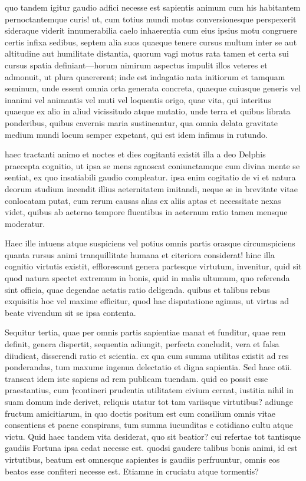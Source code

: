  quo tandem igitur gaudio adfici necesse est sapientis animum cum his habitantem pernoctantemque curis! ut, cum totius mundi motus conversionesque perspexerit sideraque viderit innumerabilia caelo inhaerentia cum eius ipsius motu congruere certis infixa sedibus, septem alia suos quaeque tenere cursus multum inter se aut altitudine aut humilitate distantia, quorum vagi motus rata tamen et certa sui cursus spatia definiant—horum nimirum aspectus impulit illos veteres et admonuit, ut plura quaererent; inde est indagatio nata initiorum et tamquam seminum, unde essent omnia orta generata concreta, quaeque cuiusque generis vel inanimi vel animantis vel muti vel loquentis origo, quae vita, qui interitus quaeque ex alio in aliud vicissitudo atque mutatio, unde terra et quibus librata ponderibus, quibus cavernis maria sustineantur, qua omnia delata gravitate medium mundi locum semper expetant, qui est idem infimus in rutundo.

 haec tractanti animo et noctes et dies cogitanti existit illa a deo Delphis praecepta cognitio, ut ipsa se mens agnoscat coniunctamque cum divina mente se sentiat, ex quo insatiabili gaudio compleatur. ipsa enim cogitatio de vi et natura deorum studium incendit illius aeternitatem imitandi, neque se in brevitate vitae conlocatam putat, cum rerum causas alias ex aliis aptas et necessitate nexas videt, quibus ab aeterno tempore fluentibus in aeternum ratio tamen mensque moderatur.

 Haec ille intuens atque suspiciens vel potius omnis partis orasque circumspiciens quanta rursus animi tranquillitate humana et citeriora considerat! hinc illa cognitio virtutis existit, efflorescunt genera partesque virtutum, invenitur, quid sit quod natura spectet extremum in bonis, quid in malis ultumum, quo referenda sint officia, quae degendae aetatis ratio deligenda. quibus et talibus rebus exquisitis hoc vel maxime efficitur, quod hac disputatione agimus, ut virtus ad beate vivendum sit se ipsa contenta.

 Sequitur tertia, quae per omnis partis sapientiae manat et funditur, quae rem definit, genera dispertit, sequentia adiungit, perfecta concludit, vera et falsa diiudicat, disserendi ratio et scientia. ex qua cum summa utilitas existit ad res ponderandas, tum maxume ingenua delectatio et digna sapientia. Sed haec otii. transeat idem iste sapiens ad rem publicam tuendam. quid eo possit esse praestantius, cum †contineri prudentia utilitatem civium cernat, iustitia nihil in suam domum inde derivet, reliquis utatur tot tam variisque virtutibus? adiunge fructum amicitiarum, in quo doctis positum est cum consilium omnis vitae consentiens et paene conspirans, tum summa iucunditas e cotidiano cultu atque victu. Quid haec tandem vita desiderat, quo sit beatior? cui refertae tot tantisque gaudiis Fortuna ipsa cedat necesse est. quodsi gaudere talibus bonis animi, id est virtutibus, beatum est omnesque sapientes is gaudiis perfruuntur, omnis eos beatos esse confiteri necesse est. Etiamne in cruciatu atque tormentis?

